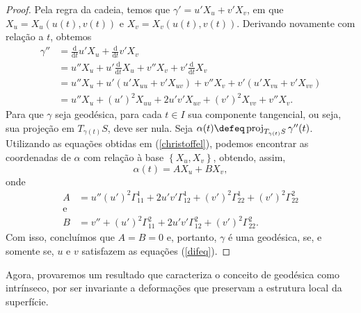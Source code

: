 \begin{proof}
    Pela regra da cadeia, temos que \( \gamma' = u' X_{ u } + v' X_{ v } \), em que \( X_{ u } = X_{ u } ( u ( t ), v ( t ) ) \) e \( X_{ v } = X_{ v } ( u ( t ), v ( t ) ) \).
    Derivando novamente com relação a \( t \), obtemos
    \begin{align*}
        \gamma''
        &= \frac{ \mathrm d }{ \mathrm d t } u' X_{ u }
        + \frac{ \mathrm d }{ \mathrm d t } v' X_{ v } \\
        &= u'' X_{ u } + u' \frac{ \mathrm d }{ \mathrm d t } X_{ u } + v''X_{ v } + v' \frac{ \mathrm d }{ \mathrm d t } X_{ v } \\
        &= u'' X_{ u }  + u' \left(
            u' X_{ uu } + v' X_{ uv }
        \right)
        + v'' X_{ v } + v' \left(
            u' X_{ vu } + v' X_{ vv }
        \right) \\
        &= u'' X_{ u } + ( u' )^2 X_{ uu } + 2 u' v' X_{ uv } + ( v' )^2 X_{ vv } + v'' X_{ v }
    .\end{align*}
    Para que \( \gamma \) seja geodésica, para cada \( t \in I \) sua componente tangencial, ou seja, sua projeção em \( T_{ \gamma ( t ) } S \),  deve ser nula.
    Seja \( \alpha ( t ) \defeq \proj_{ T_{ \gamma ( t ) } S } \gamma'' ( t ) \).
    Utilizando as equações obtidas em (\ref{christoffel}), podemos encontrar as coordenadas de \( \alpha \) com relação à base \( \left\{ X_{ u }, X_{ v } \right\} \), obtendo, assim,
    \begin{equation*}
        \alpha ( t ) = A X_{ u } + B X_{ v }
    ,\end{equation*}
    onde
    \begin{align*}
        A &= u'' ( u' )^2 \Gamma_{ 11 }^{ 1 } + 2 u' v' \Gamma_{ 12 }^{ 1 } + ( v' )^2 \Gamma_{ 22 }^{ 1 } + ( v' )^2 \Gamma_{ 22 }^{ 2 } \\
        \text{e}& \\
        B &= v'' + ( u' )^2 \Gamma_{ 11 }^{ 2 } + 2 u' v' \Gamma_{ 12 }^{ 2 } + ( v' )^2 \Gamma_{ 22 }^{ 2 }
    .\end{align*}
    Com isso, concluímos que \( A = B = 0 \) e, portanto, \( \gamma \) é uma geodésica, se, e somente se, \( u \) e \( v \) satisfazem as equações (\ref{difeq}).
\end{proof}

Agora, provaremos um resultado que caracteriza o conceito de geodésica como intrínseco, por ser invariante a deformações que preservam a estrutura local da superfície.

